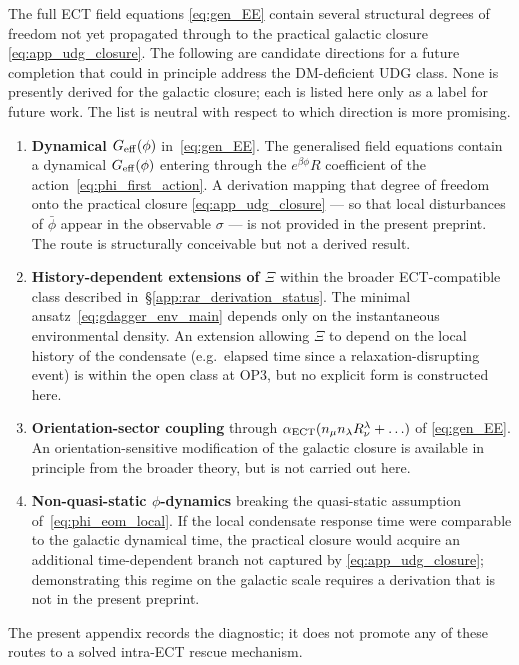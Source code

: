 The full ECT field equations \eqref{eq:gen_EE} contain several
structural degrees of freedom not yet propagated through to the
practical galactic closure \eqref{eq:app_udg_closure}.  The
following are candidate directions for a future completion that
could in principle address the DM-deficient UDG class.  None is
presently derived for the galactic closure; each is listed here
only as a label for future work.  The list is neutral with respect
to which direction is more promising.
\begin{enumerate}
\item \textbf{Dynamical $G_{\rm eff}(\phi)$} in~\eqref{eq:gen_EE}.
  The generalised field equations contain a dynamical
  $G_{\rm eff}(\phi)$ entering through the $e^{\beta\phi}R$
  coefficient of the action~\eqref{eq:phi_first_action}.  A derivation
  mapping that degree of freedom onto the practical closure
  \eqref{eq:app_udg_closure} --- so that local disturbances of
  $\bar\phi$ appear in the observable $\sigma$ --- is not provided
  in the present preprint.  The route is structurally conceivable
  but not a derived result.
\item \textbf{History-dependent extensions of $\Xi$} within the
  broader ECT-compatible class described
  in~\S\ref{app:rar_derivation_status}.  The minimal
  ansatz~\eqref{eq:gdagger_env_main} depends only on the
  instantaneous environmental density.  An extension allowing
  $\Xi$ to depend on the local history of the condensate (e.g.\
  elapsed time since a relaxation-disrupting event) is within the
  open class at OP3, but no explicit form is constructed here.
\item \textbf{Orientation-sector coupling} through
  $\alpha_{\rm ECT}(n_\mu n_\lambda R^\lambda_\nu+\ldots)$ of
  \eqref{eq:gen_EE}.  An orientation-sensitive modification of
  the galactic closure is available in principle from the
  broader theory, but is not carried out here.
\item \textbf{Non-quasi-static $\phi$-dynamics} breaking the
  quasi-static assumption
  of~\eqref{eq:phi_eom_local}.  If the local condensate
  response time were comparable to the galactic dynamical time,
  the practical closure would acquire an additional
  time-dependent branch not captured by \eqref{eq:app_udg_closure};
  demonstrating this regime on the galactic scale requires a
  derivation that is not in the present preprint.
\end{enumerate}

The present appendix records the diagnostic; it does not promote
any of these routes to a solved intra-ECT rescue mechanism.

